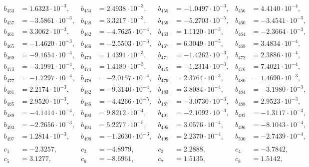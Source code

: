 \begin{align*}
b_{ 453 } &= 1.6323 \cdot 10^{ -3 }, & b_{ 454 } &= 2.4938 \cdot 10^{ -3 }, & b_{ 455 } &= -1.0497 \cdot 10^{ -3 }, & b_{ 456 } &= 4.4140 \cdot 10^{ -4 },\\ 
b_{ 457 } &= -3.5861 \cdot 10^{ -3 }, & b_{ 458 } &= 3.3217 \cdot 10^{ -3 }, & b_{ 459 } &= -5.2703 \cdot 10^{ -5 }, & b_{ 460 } &= -3.4541 \cdot 10^{ -3 },\\ 
b_{ 461 } &= 3.3062 \cdot 10^{ -3 }, & b_{ 462 } &= -4.7625 \cdot 10^{ -4 }, & b_{ 463 } &= 1.1120 \cdot 10^{ -3 }, & b_{ 464 } &= -2.3664 \cdot 10^{ -3 },\\ 
b_{ 465 } &= -1.4620 \cdot 10^{ -3 }, & b_{ 466 } &= -2.5503 \cdot 10^{ -3 }, & b_{ 467 } &= 6.3049 \cdot 10^{ -5 }, & b_{ 468 } &= 3.4834 \cdot 10^{ -4 },\\ 
b_{ 469 } &= -9.1654 \cdot 10^{ -4 }, & b_{ 470 } &= 1.4391 \cdot 10^{ -3 }, & b_{ 471 } &= -1.4262 \cdot 10^{ -3 }, & b_{ 472 } &= 2.3886 \cdot 10^{ -4 },\\ 
b_{ 473 } &= -3.1991 \cdot 10^{ -4 }, & b_{ 474 } &= 1.4180 \cdot 10^{ -3 }, & b_{ 475 } &= -1.2314 \cdot 10^{ -3 }, & b_{ 476 } &= 7.4021 \cdot 10^{ -4 },\\ 
b_{ 477 } &= -1.7297 \cdot 10^{ -4 }, & b_{ 478 } &= -2.0157 \cdot 10^{ -4 }, & b_{ 479 } &= 2.3764 \cdot 10^{ -3 }, & b_{ 480 } &= 1.4690 \cdot 10^{ -3 },\\ 
b_{ 481 } &= 2.2174 \cdot 10^{ -3 }, & b_{ 482 } &= -9.3140 \cdot 10^{ -4 }, & b_{ 483 } &= 3.8084 \cdot 10^{ -4 }, & b_{ 484 } &= -3.1980 \cdot 10^{ -3 },\\ 
b_{ 485 } &= 2.9520 \cdot 10^{ -3 }, & b_{ 486 } &= -4.4266 \cdot 10^{ -5 }, & b_{ 487 } &= -3.0730 \cdot 10^{ -3 }, & b_{ 488 } &= 2.9523 \cdot 10^{ -3 },\\ 
b_{ 489 } &= -4.1414 \cdot 10^{ -4 }, & b_{ 490 } &= 9.8212 \cdot 10^{ -4 }, & b_{ 491 } &= -2.1092 \cdot 10^{ -3 }, & b_{ 492 } &= -1.3117 \cdot 10^{ -3 },\\ 
b_{ 493 } &= -2.2656 \cdot 10^{ -3 }, & b_{ 494 } &= 5.2277 \cdot 10^{ -5 }, & b_{ 495 } &= 3.0576 \cdot 10^{ -4 }, & b_{ 496 } &= -8.1043 \cdot 10^{ -4 },\\ 
b_{ 497 } &= 1.2814 \cdot 10^{ -3 }, & b_{ 498 } &= -1.2630 \cdot 10^{ -3 }, & b_{ 499 } &= 2.2370 \cdot 10^{ -4 }, & b_{ 500 } &= -2.7439 \cdot 10^{ -4 },\\ 
&&&&&&& \\ 
c_{ 1 } &= -2.3257, & c_{ 2 } &= -4.8979, & c_{ 3 } &= 2.2888, & c_{ 4 } &= -3.7842,\\ 
c_{ 5 } &= 3.1277, & c_{ 6 } &= -8.6961, & c_{ 7 } &= 1.5135, & c_{ 8 } &= 1.5142,\\ 

\end{align*}
